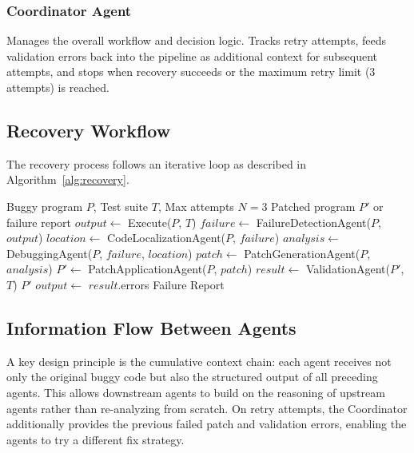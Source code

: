 \documentclass[conference]{IEEEtran}
\begin{document}
\subsubsection{Coordinator Agent}
Manages the overall workflow and decision logic. Tracks retry attempts, feeds validation errors back into the pipeline as additional context for subsequent attempts, and stops when recovery succeeds or the maximum retry limit (3 attempts) is reached.

\subsection{Recovery Workflow}
The recovery process follows an iterative loop as described in Algorithm~\ref{alg:recovery}.

\begin{algorithm}
\caption{Multi-Agent Recovery Loop}
\label{alg:recovery}
\begin{algorithmic}[1]
\REQUIRE Buggy program $P$, Test suite $T$, Max attempts $N=3$
\ENSURE Patched program $P'$ or failure report
\STATE $output \leftarrow$ Execute($P$, $T$)
    \STATE $failure \leftarrow$ FailureDetectionAgent($P$, $output$)
    \STATE $location \leftarrow$ CodeLocalizationAgent($P$, $failure$)
    \STATE $analysis \leftarrow$ DebuggingAgent($P$, $failure$, $location$)
    \STATE $patch \leftarrow$ PatchGenerationAgent($P$, $analysis$)
    \STATE $P' \leftarrow$ PatchApplicationAgent($P$, $patch$)
    \STATE $result \leftarrow$ ValidationAgent($P'$, $T$)
        \RETURN $P'$ 
    \ELSE
        \STATE $output \leftarrow$ $result$.errors 
    \ENDIF
\ENDFOR
\RETURN Failure Report
\end{algorithmic}
\end{algorithm}

\subsection{Information Flow Between Agents}
A key design principle is the cumulative context chain: each agent receives not only the original buggy code but also the structured output of all preceding agents. This allows downstream agents to build on the reasoning of upstream agents rather than re-analyzing from scratch. On retry attempts, the Coordinator additionally provides the previous failed patch and validation errors, enabling the agents to try a different fix strategy.
\end{document}
